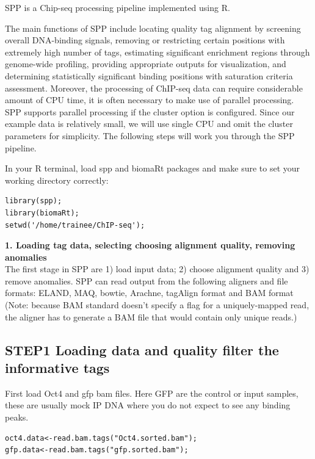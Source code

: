 \begin{information}
SPP is a Chip-seq processing pipeline implemented using R. 

The main functions of SPP include locating quality tag alignment by screening overall DNA-binding signals, 
removing or restricting certain positions with extremely high number of tags, 
estimating significant enrichment regions through genome-wide profiling, providing appropriate outputs for visualization, 
and determining statistically significant binding positions with saturation criteria assessment.
 Moreover, the processing of ChIP-seq data can require considerable amount of CPU time, it is often necessary to make use of parallel processing. 
 SPP supports parallel processing if the cluster option is configured. 
 Since our example data is relatively small, we will use single CPU and omit the cluster parameters for simplicity. 
 The following steps will work you through the SPP pipeline.
\end{information}

\begin{steps}
In your R terminal, load spp and biomaRt packages and make sure to set your working directory correctly:

\begin{lstlisting}
library(spp);
library(biomaRt);
setwd('/home/trainee/ChIP-seq');
\end{lstlisting}
\end{steps}

\begin{note}
\textbf{1. Loading tag data, selecting choosing alignment quality, removing anomalies}\\
The first stage in SPP are 1) load input data; 2) choose alignment quality and 3) remove anomalies.  
SPP can read output from the following aligners and file formats: ELAND, MAQ, bowtie, Arachne, tagAlign format and BAM format 
(Note: because BAM standard doesn't specify a flag for a uniquely-mapped read, the aligner has to generate a BAM file that would contain only unique reads.)
\end{note}

\subsection {STEP1 Loading data and quality filter the informative tags}
\begin{steps}
First load Oct4 and gfp bam files. Here GFP are the control or input samples, these are usually mock IP DNA where you do not expect to see any binding peaks.

\begin{lstlisting}
oct4.data<-read.bam.tags("Oct4.sorted.bam");
gfp.data<-read.bam.tags("gfp.sorted.bam");
\end{lstlisting}
\end{steps}

